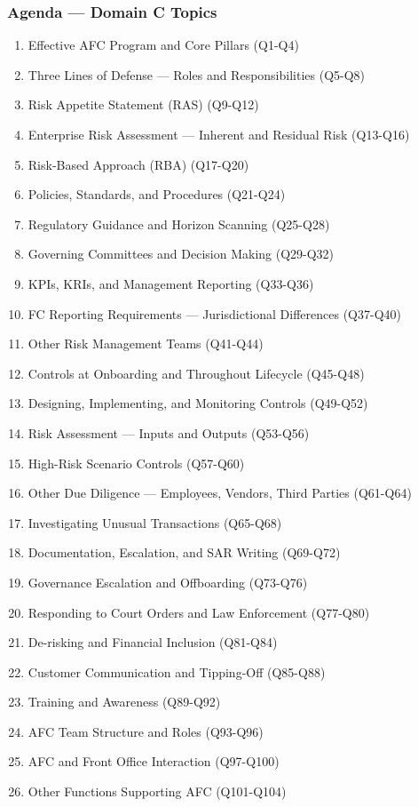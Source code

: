 \documentclass[12pt,aspectratio=169]{beamer}
\renewcommand{\scriptsize}{\fontsize{5}{6}\selectfont}
\begin{document}
	\begin{frame}
		\frametitle{\fontsize{11}{13}\selectfont Agenda — Domain C Topics}
		\scriptsize
		\begin{enumerate}
			\item Effective AFC Program and Core Pillars (Q1-Q4)
			\item Three Lines of Defense — Roles and Responsibilities (Q5-Q8)
			\item Risk Appetite Statement (RAS) (Q9-Q12)
			\item Enterprise Risk Assessment — Inherent and Residual Risk (Q13-Q16)
			\item Risk-Based Approach (RBA) (Q17-Q20)
			\item Policies, Standards, and Procedures (Q21-Q24)
			\item Regulatory Guidance and Horizon Scanning (Q25-Q28)
			\item Governing Committees and Decision Making (Q29-Q32)
			\item KPIs, KRIs, and Management Reporting (Q33-Q36)
			\item FC Reporting Requirements — Jurisdictional Differences (Q37-Q40)
			\item Other Risk Management Teams (Q41-Q44)
			\item Controls at Onboarding and Throughout Lifecycle (Q45-Q48)
			\item Designing, Implementing, and Monitoring Controls (Q49-Q52)
			\item Risk Assessment — Inputs and Outputs (Q53-Q56)
			\item High-Risk Scenario Controls (Q57-Q60)
			\item Other Due Diligence — Employees, Vendors, Third Parties (Q61-Q64)
			\item Investigating Unusual Transactions (Q65-Q68)
			\item Documentation, Escalation, and SAR Writing (Q69-Q72)
			\item Governance Escalation and Offboarding (Q73-Q76)
			\item Responding to Court Orders and Law Enforcement (Q77-Q80)
			\item De-risking and Financial Inclusion (Q81-Q84)
			\item Customer Communication and Tipping-Off (Q85-Q88)
			\item Training and Awareness (Q89-Q92)
			\item AFC Team Structure and Roles (Q93-Q96)
			\item AFC and Front Office Interaction (Q97-Q100)
			\item Other Functions Supporting AFC (Q101-Q104)
		\end{enumerate}
	\end{frame}
	
\end{document}

